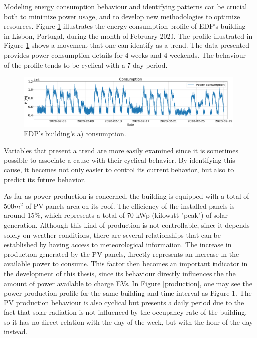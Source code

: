 Modeling energy consumption behaviour and identifying patterns can be crucial both to minimize power usage, and to develop new methodologies to optimize resources. Figure \ref{consumption} illustrates the energy consumption profile of \ac{EDP}'s building in Lisbon, Portugal, during the month of February 2020. The profile illustrated in Figure \ref{consumption} shows a movement that one can identify as a trend. The data presented provides power consumption details for 4 weeks and 4 weekends. The behaviour of the profile tends to be cyclical with a 7 day period. 
\begin{figure}[h!]
    \centering
    \begin{center}
    \includegraphics[width=1\textwidth]{Images/power_consumption.png}
    \caption{EDP's building's a) consumption.}
    \label{consumption}
    \end{center}
\end{figure}


Variables that present a trend are more easily examined since it is sometimes possible to associate a cause with their cyclical behavior. By identifying this cause, it becomes not only easier to control its current behavior, but also to predict its future behavior. 


As far as power production is concerned, the building is equipped with a total of 500$m^2$ of \ac{PV} panels area on its roof. The efficiency of the installed panels is around 15$\%$, which represents a total of 70 kWp (kilowatt "peak") of solar generation. Although this kind of production is not controllable, since it depends solely on weather conditions, there are several relationships that can be established by having access to meteorological information. The increase in production generated by the \ac{PV} panels, directly represents an increase in the available power to consume. This factor then becomes an important indicator in the development of this thesis, since its behaviour directly influences the the amount of power available to charge \ac{EV}s. In Figure \ref{production}, one may see the power production profile for the same building and time-interval as Figure \ref{consumption}. The \ac{PV} production behaviour is also cyclical but presents a daily period due to the fact that solar radiation is not influenced by the occupancy rate of the building, so it has no direct relation with the day of the week, but with the hour of the day instead.

